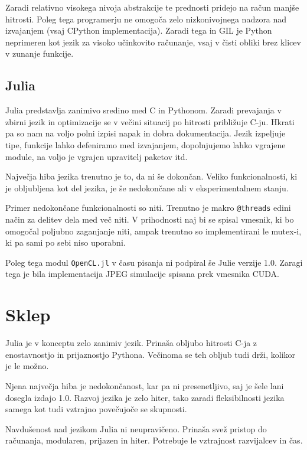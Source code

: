 \documentclass[journal,a4paper,twoside]{sty/IEEEtran}
\begin{document}
Zaradi relativno visokega nivoja abstrakcije te prednosti pridejo na račun manjše hitrosti.
Poleg tega programerju ne omogoča zelo nizkonivojnega nadzora nad izvajanjem (vsaj CPython implementacija).
Zaradi tega in GIL je Python neprimeren kot jezik za visoko učinkovito računanje, vsaj v čisti obliki brez klicev v zunanje funkcije.

\subsection{Julia}

Julia predstavlja zanimivo sredino med C in Pythonom.
Zaradi prevajanja v zbirni jezik in optimizacije se v večini situacij po hitrosti približuje C-ju.
Hkrati pa so nam na voljo polni izpisi napak in dobra dokumentacija.
Jezik izpeljuje tipe, funkcije lahko defeniramo med izvajanjem, dopolnjujemo lahko vgrajene module, na voljo je vgrajen upravitelj paketov itd.

Največja hiba jezika trenutno je to, da ni še dokončan.
Veliko funkcionalnosti, ki je obljubljena kot del jezika, je še nedokončane ali v eksperimentalnem stanju.

Primer nedokončane funkcionalnosti so niti.
Trenutno je makro \texttt{@threads} edini način za delitev dela med več niti.
V prihodnosti naj bi se spisal vmesnik, ki bo omogočal poljubno zaganjanje niti, ampak trenutno so implementirani le mutex-i, ki pa sami po sebi niso
	uporabni.

Poleg tega modul \texttt{OpenCL.jl} v času pisanja ni podpiral še Julie verzije 1.0.
Zaragi tega je bila implementacija JPEG simulacije spisana prek vmesnika CUDA.

\section{Sklep}

Julia je v konceptu zelo zanimiv jezik.
Prinaša obljubo hitrosti C-ja z enostavnostjo in prijaznostjo Pythona.
Večinoma se teh obljub tudi drži, kolikor je le možno.

Njena največja hiba je nedokončanost, kar pa ni presenetljivo, saj je šele lani dosegla izdajo 1.0.
Razvoj jezika je zelo hiter, tako zaradi fleksibilnosti jezika samega kot tudi vztrajno povečujoče se skupnosti.

Navdušenost nad jezikom Julia ni neupravičeno.
Prinaša svež pristop do računanja, modularen, prijazen in hiter.
Potrebuje le vztrajnost razvijalcev in čas.
\end{document}
